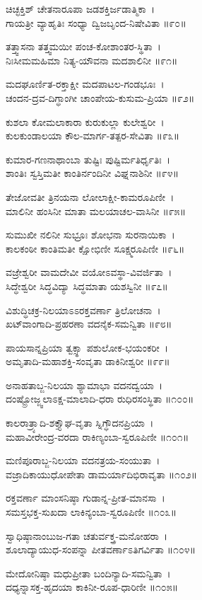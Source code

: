 ಚಿಚ್ಛಕ್ತಿಶ್ ಚೇತನಾರೂಪಾ ಜಡಶಕ್ತಿರ್ಜಡಾತ್ಮಿಕಾ~।\\
ಗಾಯತ್ರೀ ವ್ಯಾಹೃತಿಃ ಸಂಧ್ಯಾ ದ್ವಿಜಬೃಂದ-ನಿಷೇವಿತಾ ॥೯೦॥

ತತ್ತ್ವಾಸನಾ ತತ್ತ್ವಮಯೀ ಪಂಚ-ಕೋಶಾಂತರ-ಸ್ಥಿತಾ~।\\
ನಿಃಸೀಮಮಹಿಮಾ ನಿತ್ಯ-ಯೌವನಾ ಮದಶಾಲಿನೀ ॥೯೧॥

ಮದಘೂರ್ಣಿತ-ರಕ್ತಾಕ್ಷೀ ಮದಪಾಟಲ-ಗಂಡಭೂಃ~।\\
ಚಂದನ-ದ್ರವ-ದಿಗ್ಧಾಂಗೀ ಚಾಂಪೇಯ-ಕುಸುಮ-ಪ್ರಿಯಾ ॥೯೨॥

ಕುಶಲಾ ಕೋಮಲಾಕಾರಾ ಕುರುಕುಲ್ಲಾ ಕುಲೇಶ್ವರೀ~।\\
ಕುಲಕುಂಡಾಲಯಾ ಕೌಲ-ಮಾರ್ಗ-ತತ್ಪರ-ಸೇವಿತಾ ॥೯೩॥

ಕುಮಾರ-ಗಣನಾಥಾಂಬಾ ತುಷ್ಟಿಃ ಪುಷ್ಟಿರ್ಮತಿರ್ಧೃತಿಃ~।\\
ಶಾಂತಿಃ ಸ್ವಸ್ತಿಮತೀ ಕಾಂತಿರ್ನಂದಿನೀ ವಿಘ್ನನಾಶಿನೀ ॥೯೪॥

ತೇಜೋವತೀ ತ್ರಿನಯನಾ ಲೋಲಾಕ್ಷೀ-ಕಾಮರೂಪಿಣೀ~।\\
ಮಾಲಿನೀ ಹಂಸಿನೀ ಮಾತಾ ಮಲಯಾಚಲ-ವಾಸಿನೀ ॥೯೫॥

ಸುಮುಖೀ ನಲಿನೀ ಸುಭ್ರೂಃ ಶೋಭನಾ ಸುರನಾಯಿಕಾ~।\\
ಕಾಲಕಂಠೀ ಕಾಂತಿಮತೀ ಕ್ಷೋಭಿಣೀ ಸೂಕ್ಷ್ಮರೂಪಿಣೀ ॥೯೬॥

ವಜ್ರೇಶ್ವರೀ ವಾಮದೇವೀ ವಯೋಽವಸ್ಥಾ-ವಿವರ್ಜಿತಾ~।\\
ಸಿದ್ಧೇಶ್ವರೀ ಸಿದ್ಧವಿದ್ಯಾ ಸಿದ್ಧಮಾತಾ ಯಶಸ್ವಿನೀ ॥೯೭॥

ವಿಶುದ್ಧಿಚಕ್ರ-ನಿಲಯಾಽಽರಕ್ತವರ್ಣಾ ತ್ರಿಲೋಚನಾ~।\\
ಖಟ್‍ವಾಂಗಾದಿ-ಪ್ರಹರಣಾ ವದನೈಕ-ಸಮನ್ವಿತಾ ॥೯೮॥

ಪಾಯಸಾನ್ನಪ್ರಿಯಾ ತ್ವಕ್ಸ್ಥಾ ಪಶುಲೋಕ-ಭಯಂಕರೀ~।\\
ಅಮೃತಾದಿ-ಮಹಾಶಕ್ತಿ-ಸಂವೃತಾ ಡಾಕಿನೀಶ್ವರೀ ॥೯೯॥

ಅನಾಹತಾಬ್ಜ-ನಿಲಯಾ ಶ್ಯಾಮಾಭಾ ವದನದ್ವಯಾ~।\\
ದಂಷ್ಟ್ರೋಜ್ಜ್ವಲಾಽಕ್ಷ-ಮಾಲಾದಿ-ಧರಾ ರುಧಿರಸಂಸ್ಥಿತಾ ॥೧೦೦॥

ಕಾಲರಾತ್ರ್ಯಾದಿ-ಶಕ್ತ್ಯೌಘ-ವೃತಾ ಸ್ನಿಗ್ಧೌದನಪ್ರಿಯಾ~।\\
ಮಹಾವೀರೇಂದ್ರ-ವರದಾ ರಾಕಿಣ್ಯಂಬಾ-ಸ್ವರೂಪಿಣೀ ॥೧೦೧॥

ಮಣಿಪೂರಾಬ್ಜ-ನಿಲಯಾ ವದನತ್ರಯ-ಸಂಯುತಾ~।\\
ವಜ್ರಾದಿಕಾಯುಧೋಪೇತಾ ಡಾಮರ್ಯಾದಿಭಿರಾವೃತಾ ॥೧೦೨॥

ರಕ್ತವರ್ಣಾ ಮಾಂಸನಿಷ್ಠಾ  ಗುಡಾನ್ನ-ಪ್ರೀತ-ಮಾನಸಾ~।\\
ಸಮಸ್ತಭಕ್ತ-ಸುಖದಾ ಲಾಕಿನ್ಯಂಬಾ-ಸ್ವರೂಪಿಣೀ ॥೧೦೩॥

ಸ್ವಾಧಿಷ್ಠಾನಾಂಬುಜ-ಗತಾ ಚತುರ್ವಕ್ತ್ರ-ಮನೋಹರಾ~।\\
ಶೂಲಾದ್ಯಾಯುಧ-ಸಂಪನ್ನಾ ಪೀತವರ್ಣಾಽತಿಗರ್ವಿತಾ ॥೧೦೪॥

ಮೇದೋನಿಷ್ಠಾ ಮಧುಪ್ರೀತಾ ಬಂದಿನ್ಯಾದಿ-ಸಮನ್ವಿತಾ~।\\
ದಧ್ಯನ್ನಾಸಕ್ತ-ಹೃದಯಾ ಕಾಕಿನೀ-ರೂಪ-ಧಾರಿಣೀ ॥೧೦೫॥

